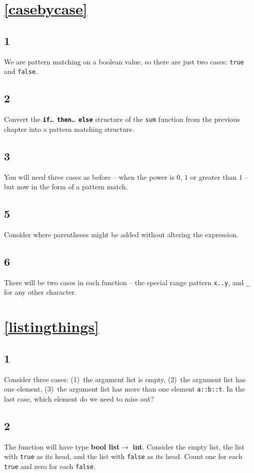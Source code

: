 \documentclass[]{book}
\newcommand{\pif}{\textbf{if}\xspace}
\newcommand{\pthen}{\textbf{then}\xspace}
\newcommand{\pelse}{\textbf{else}\xspace}
\begin{document}
\section*{\ref{casebycase}\\ }
\subsection*{1}
We are pattern matching on a boolean value, so there are just two cases: \texttt{true} and \texttt{false}.
\subsection*{2}
Convert the \texttt{\pif\ldots\ \pthen\ldots\ \pelse} structure of the \texttt{sum} function from the previous chapter into a pattern matching structure.
\subsection*{3}
You will need three cases as before -- when the power is $0$, $1$ or greater than $1$ -- but now in the form of a pattern match.
\subsection*{5}
Consider where parentheses might be added without altering the expression.
\subsection*{6}
There will be two cases in each function -- the special range pattern \texttt{x..y}, and \texttt{\_} for any other character.

\section*{\ref{listingthings}\\ }
\subsection*{1}
Consider three cases: (1)~the argument list is empty, (2)~the argument list has one element, (3)~the argument list has more than one element \texttt{a::b::t}. In the last case, which element do we need to miss out?
\subsection*{2}
The function will have type \textrm{\textbf{bool list}}$ \rightarrow$ \textrm{\textbf{int}}. Consider the empty list, the list with \texttt{true} as its head, and the list with \texttt{false} as its head. Count one for each \texttt{true} and zero for each \texttt{false}.
\end{document}
